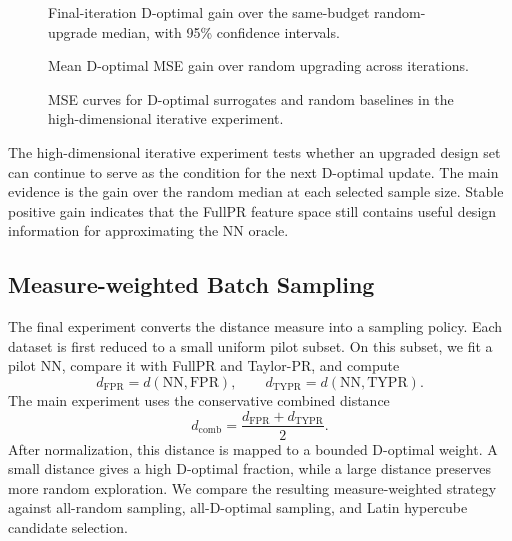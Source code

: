 \documentclass[]{interact}
\theoremstyle{plain}
\theoremstyle{definition}
\theoremstyle{remark}
\begin{document}
\begin{figure}[htbp]
\centering
{}
\caption{Final-iteration D-optimal gain over the same-budget random-upgrade
median, with 95\% confidence intervals.}
\label{fig:highdim-final-gain}
\end{figure}

\begin{figure}[htbp]
\centering
{}
\hfill
{}
\caption{Mean D-optimal MSE gain over random upgrading across iterations.}
\label{fig:highdim-gain-curves}
\end{figure}

\begin{figure}[htbp]
\centering
{}
\hfill
{}
\caption{MSE curves for D-optimal surrogates and random baselines in the
high-dimensional iterative experiment.}
\label{fig:highdim-mse-curves}
\end{figure}

\FloatBarrier

The high-dimensional iterative experiment tests whether an upgraded design set
can continue to serve as the condition for the next D-optimal update. The main
evidence is the gain over the random median at each selected sample size. Stable
positive gain indicates that the FullPR feature space still contains useful
design information for approximating the NN oracle.

\subsection{Measure-weighted Batch Sampling}

The final experiment converts the distance measure into a sampling policy. Each
dataset is first reduced to a small uniform pilot subset. On this subset, we fit
a pilot NN, compare it with FullPR and Taylor-PR, and compute
\[
    d_{\mathrm{FPR}}=d(\mathrm{NN},\mathrm{FPR}),\qquad
    d_{\mathrm{TYPR}}=d(\mathrm{NN},\mathrm{TYPR}).
\]
The main experiment uses the conservative combined distance
\[
    d_{\mathrm{comb}}=\frac{d_{\mathrm{FPR}}+d_{\mathrm{TYPR}}}{2}.
\]
After normalization, this distance is mapped to a bounded D-optimal weight. A
small distance gives a high D-optimal fraction, while a large distance preserves
more random exploration. We compare the resulting measure-weighted strategy
against all-random sampling, all-D-optimal sampling, and Latin hypercube
candidate selection.
\end{document}

